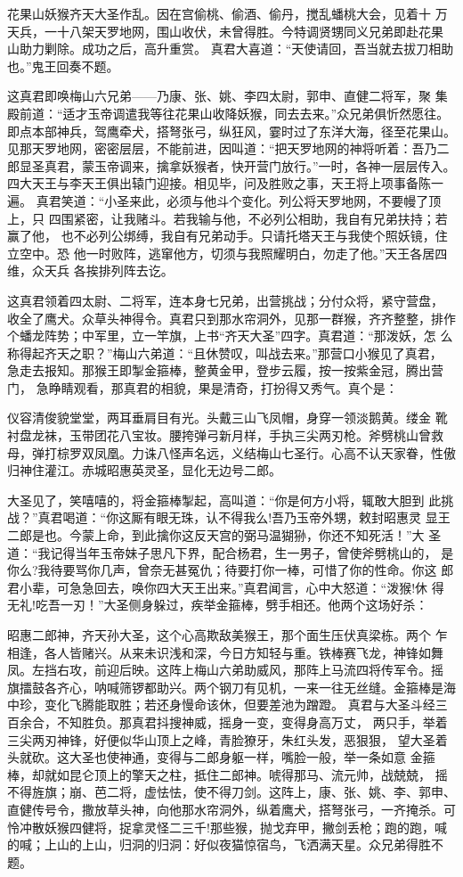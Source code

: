 花果山妖猴齐天大圣作乱。因在宫偷桃、偷酒、偷丹，搅乱蟠桃大会，见着十
万天兵，一十八架天罗地网，围山收伏，未曾得胜。今特调贤甥同义兄弟即赴花果
山助力剿除。成功之后，高升重赏。
真君大喜道：“天使请回，吾当就去拔刀相助也。”鬼王回奏不题。

这真君即唤梅山六兄弟——乃康、张、姚、李四太尉，郭申、直健二将军，聚
集殿前道：“适才玉帝调遣我等往花果山收降妖猴，同去去来。”众兄弟俱忻然愿往。
即点本部神兵，驾鹰牵犬，搭弩张弓，纵狂风，霎时过了东洋大海，径至花果山。
见那天罗地网，密密层层，不能前进，因叫道：“把天罗地网的神将听着：吾乃二
郎显圣真君，蒙玉帝调来，擒拿妖猴者，快开营门放行。”一时，各神一层层传入。
四大天王与李天王俱出辕门迎接。相见毕，问及胜败之事，天王将上项事备陈一遍。
真君笑道：“小圣来此，必须与他斗个变化。列公将天罗地网，不要幔了顶上，只
四围紧密，让我赌斗。若我输与他，不必列公相助，我自有兄弟扶持；若赢了他，
也不必列公绑缚，我自有兄弟动手。只请托塔天王与我使个照妖镜，住立空中。恐
他一时败阵，逃窜他方，切须与我照耀明白，勿走了他。”天王各居四维，众天兵
各挨排列阵去讫。

这真君领着四太尉、二将军，连本身七兄弟，出营挑战；分付众将，紧守营盘，
收全了鹰犬。众草头神得令。真君只到那水帘洞外，见那一群猴，齐齐整整，排作
个蟠龙阵势；中军里，立一竿旗，上书“齐天大圣”四字。真君道：“那泼妖，怎
么称得起齐天之职？”梅山六弟道：“且休赞叹，叫战去来。”那营口小猴见了真君，
急走去报知。那猴王即掣金箍棒，整黄金甲，登步云履，按一按紫金冠，腾出营门，
急睁睛观看，那真君的相貌，果是清奇，打扮得又秀气。真个是：

仪容清俊貌堂堂，两耳垂肩目有光。头戴三山飞凤帽，身穿一领淡鹅黄。缕金
靴衬盘龙袜，玉带团花八宝妆。腰挎弹弓新月样，手执三尖两刃枪。斧劈桃山曾救
母，弹打棕罗双凤凰。力诛八怪声名远，义结梅山七圣行。心高不认天家眷，性傲
归神住灌江。赤城昭惠英灵圣，显化无边号二郎。

大圣见了，笑嘻嘻的，将金箍棒掣起，高叫道：“你是何方小将，辄敢大胆到
此挑战？”真君喝道：“你这厮有眼无珠，认不得我么!吾乃玉帝外甥，敕封昭惠灵
显王二郎是也。今蒙上命，到此擒你这反天宫的弼马温猢狲，你还不知死活！”大
圣道：“我记得当年玉帝妹子思凡下界，配合杨君，生一男子，曾使斧劈桃山的，
是你么?我待要骂你几声，曾奈无甚冤仇；待要打你一棒，可惜了你的性命。你这
郎君小辈，可急急回去，唤你四大天王出来。”真君闻言，心中大怒道：“泼猴!休
得无礼!吃吾一刃！”大圣侧身躲过，疾举金箍棒，劈手相还。他两个这场好杀：

昭惠二郎神，齐天孙大圣，这个心高欺敌美猴王，那个面生压伏真梁栋。两个
乍相逢，各人皆赌兴。从来未识浅和深，今日方知轻与重。铁棒赛飞龙，神锋如舞
凤。左挡右攻，前迎后映。这阵上梅山六弟助威风，那阵上马流四将传军令。摇
旗擂鼓各齐心，呐喊筛锣都助兴。两个钢刀有见机，一来一往无丝缝。金箍棒是海
中珍，变化飞腾能取胜；若还身慢命该休，但要差池为蹭蹬。
真君与大圣斗经三百余合，不知胜负。那真君抖搜神威，摇身一变，变得身高万丈，
两只手，举着三尖两刃神锋，好便似华山顶上之峰，青脸獠牙，朱红头发，恶狠狠，
望大圣着头就砍。这大圣也使神通，变得与二郎身躯一样，嘴脸一般，举一条如意
金箍棒，却就如昆仑顶上的擎天之柱，抵住二郎神。唬得那马、流元帅，战兢兢，
摇不得旌旗；崩、芭二将，虚怯怯，使不得刀剑。这阵上，康、张、姚、李、郭申、
直健传号令，撒放草头神，向他那水帘洞外，纵着鹰犬，搭弩张弓，一齐掩杀。可
怜冲散妖猴四健将，捉拿灵怪二三千!那些猴，抛戈弃甲，撇剑丢枪；跑的跑，喊
的喊；上山的上山，归洞的归洞：好似夜猫惊宿鸟，飞洒满天星。众兄弟得胜不题。

